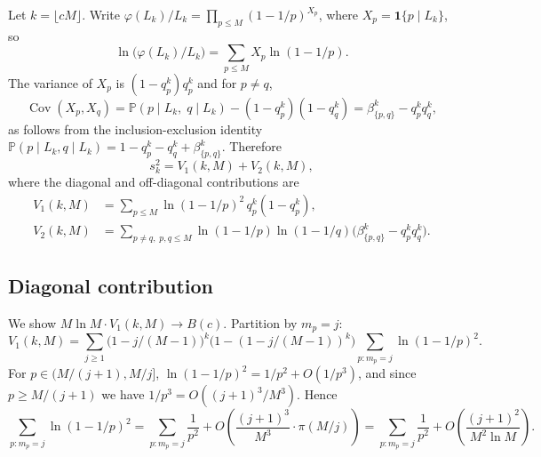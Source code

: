 \documentclass[11pt]{article}
\theoremstyle{remark}
\newcommand{\PP}{\mathbb{P}}
\newcommand{\one}{\mathbf{1}}
\DeclareMathOperator{\Cov}{Cov}
\begin{document}
Let $k = \lfloor cM \rfloor$. Write $\varphi(L_k)/L_k = \prod_{p \leq M}(1 - 1/p)^{X_p}$, where $X_p = \one\{p \mid L_k\}$, so
\[
\ln\bigl(\varphi(L_k)/L_k\bigr) = \sum_{p \leq M} X_p \ln(1 - 1/p).
\]
The variance of $X_p$ is $(1 - q_p^k) q_p^k$ and for $p \neq q$,
\[
\Cov(X_p, X_q) = \PP(p \mid L_k,\; q \mid L_k) - (1 - q_p^k)(1 - q_q^k) = \beta_{\{p,q\}}^k - q_p^k q_q^k,
\]
as follows from the inclusion-exclusion identity $\PP(p \mid L_k, q \mid L_k) = 1 - q_p^k - q_q^k + \beta_{\{p,q\}}^k$. Therefore
\begin{equation}\label{eq:Var-W-decomp}
s_k^2 = V_1(k, M) + V_2(k, M),
\end{equation}
where the diagonal and off-diagonal contributions are
\begin{align*}
V_1(k, M) &= \sum_{p \leq M} \ln(1 - 1/p)^2\, q_p^k (1 - q_p^k),\\
V_2(k, M) &= \sum_{p \neq q,\; p, q \leq M} \ln(1 - 1/p) \ln(1 - 1/q)\bigl(\beta_{\{p,q\}}^k - q_p^k q_q^k\bigr).
\end{align*}

\subsection{Diagonal contribution}\label{sec:variance-V1}

We show $M \ln M \cdot V_1(k, M) \to B(c)$. Partition by $m_p = j$:
\[
V_1(k, M) = \sum_{j \geq 1}\bigl(1 - j/(M-1)\bigr)^k\bigl(1 - (1 - j/(M-1))^k\bigr) \sum_{p \colon m_p = j} \ln(1 - 1/p)^2.
\]
For $p \in (M/(j+1), M/j]$, $\ln(1 - 1/p)^2 = 1/p^2 + O(1/p^3)$, and since $p \geq M/(j+1)$ we have $1/p^3 = O((j+1)^3/M^3)$. Hence
\[
\sum_{p \colon m_p = j} \ln(1 - 1/p)^2 = \sum_{p \colon m_p = j} \frac{1}{p^2} + O\!\left(\frac{(j+1)^3}{M^3}\cdot \pi(M/j)\right) = \sum_{p \colon m_p = j} \frac{1}{p^2} + O\!\left(\frac{(j+1)^2}{M^2 \ln M}\right).
\]
\end{document}
